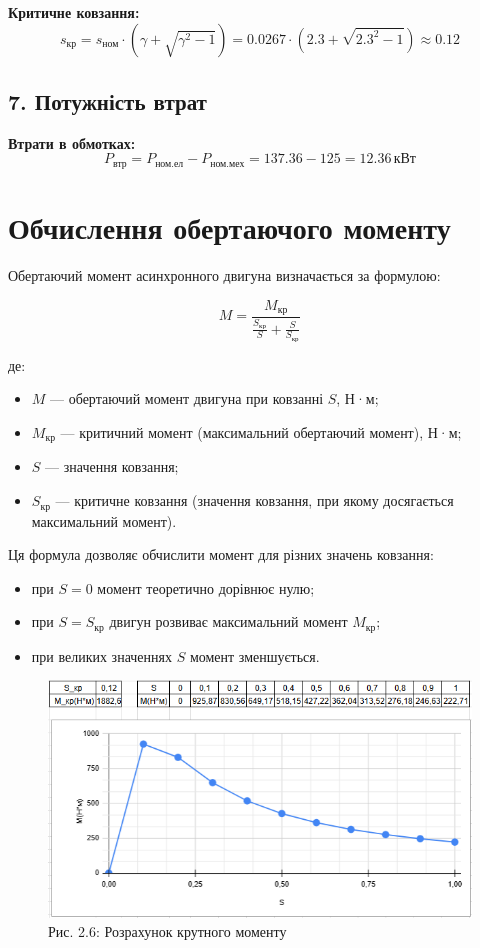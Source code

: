 \documentclass[a4paper]{article}
\begin{document}
\textbf{Критичне ковзання:}
\[
s_{\text{кр}} = s_{\text{ном}} \cdot \left( \gamma + \sqrt{\gamma^2 - 1} \right) = 0.0267 \cdot \left( 2.3 + \sqrt{2.3^2 - 1} \right) \approx 0.12
\]

\subsection*{7. Потужність втрат}
\textbf{Втрати в обмотках:}
\[
P_{\text{втр}} = P_{\text{ном.ел}} - P_{\text{ном.мех}} = 137.36 - 125 = 12.36 \, \text{кВт}
\]



\section*{Обчислення обертаючого моменту}

Обертаючий момент асинхронного двигуна визначається за формулою:

\begin{equation}
    M = \frac{M_{\text{кр}}}{\frac{S_{\text{кр}}}{S} + \frac{S}{S_{\text{кр}}}}
\end{equation}

де:
\begin{itemize}
    \item $M$ — обертаючий момент двигуна при ковзанні $S$, Н·м;
    \item $M_{\text{кр}}$ — критичний момент (максимальний обертаючий момент), Н·м;
    \item $S$ — значення ковзання;
    \item $S_{\text{кр}}$ — критичне ковзання (значення ковзання, при якому досягається максимальний момент).
\end{itemize}

Ця формула дозволяє обчислити момент для різних значень ковзання:
\begin{itemize}
    \item при $S = 0$ момент теоретично дорівнює нулю;
    \item при $S = S_{\text{кр}}$ двигун розвиває максимальний момент $M_{\text{кр}}$;
    \item при великих значеннях $S$ момент зменшується.
\end{itemize}

\begin{figure}[h]
    \centering
    \includegraphics[width=1\textwidth]{imgs/LW2.5.png}
    \caption*{Рис. 2.6: Розрахунок крутного моменту}
\end{figure} 
\end{document}
